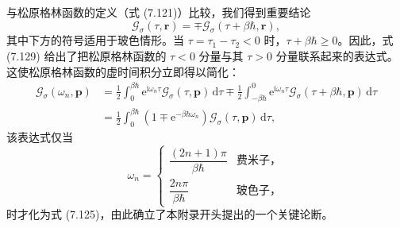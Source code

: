 与松原格林函数的定义（式 (7.121)）比较，我们得到重要结论
\begin{equation*}
\mathcal{G}_{\sigma}(\tau,\mathbf{r}) = \mp\mathcal{G}_{\sigma}(\tau + \beta\hbar,\mathbf{r}),
\tag{7.129}
\end{equation*}
其中下方的符号适用于玻色情形。当 $\tau = \tau_{1} - \tau_{2} < 0$ 时，$\tau + \beta\hbar \ge 0$。因此，式 (7.129) 给出了把松原格林函数的 $\tau < 0$ 分量与其 $\tau > 0$ 分量联系起来的表达式。这使松原格林函数的虚时间积分立即得以简化：
\begin{align*}
\mathcal{G}_{\sigma}(\omega_{n},\mathbf{p}) &= \frac{1}{2}\int_{0}^{\beta\hbar}\mathrm{e}^{\mathrm{i}\omega_{n}\tau}\mathcal{G}_{\sigma}(\tau,\mathbf{p})\,\mathrm{d}\tau \mp \frac{1}{2}\int_{-\beta\hbar}^{0}\mathrm{e}^{\mathrm{i}\omega_{n}\tau}\mathcal{G}_{\sigma}(\tau + \beta\hbar,\mathbf{p})\,\mathrm{d}\tau \\
&= \frac{1}{2}\int_{0}^{\beta\hbar}\left(1 \mp \mathrm{e}^{-\beta\hbar\omega_{n}}\right)\mathcal{G}_{\sigma}(\tau,\mathbf{p})\,\mathrm{d}\tau,
\tag{7.130}
\end{align*}
该表达式仅当
\begin{equation*}
\omega_{n} =
\begin{cases}
\dfrac{(2n+1)\pi}{\beta\hbar} & \text{费米子，}\\[2ex]
\dfrac{2n\pi}{\beta\hbar} & \text{玻色子，}
\end{cases}
\end{equation*}
时才化为式 (7.125)，由此确立了本附录开头提出的一个关键论断。

